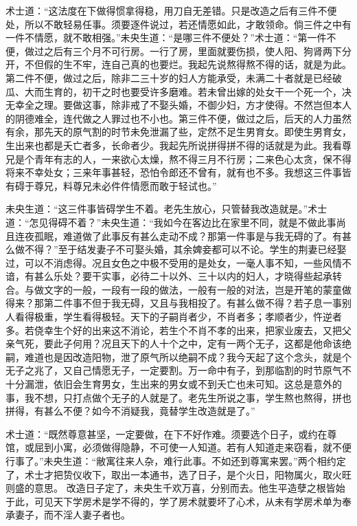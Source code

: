 \documentclass[a4paper,12pt,UTF8,twoside]{ctexbook}
\begin{document}
术士道：“这法度在下做得惯拿得稳，用刀自无差错。只是改造之后有三件不便处，所以不敢轻易任事。须要逐件说过，若还情愿如此，才敢领命。倘三件之中有一件不情愿，就不敢相强。”未央生道：“是哪三件不便处？”术士道：“第一件不便，做过之后有三个月不可行房。一行了房，里面就要伤损，使人阳、狗肾两下分开，不但假的生不牢，连自己真的也要烂。我起先说熬得熬不得的话，就是为此。第二件不便，做过之后，除非二三十岁的妇人方能承受，未满二十者就是已经破瓜、大而生育的，初干之时也要受许多磨难。若未曾出嫁的处女干一个死一个，决无幸全之理。要做这事，除非戒了不娶头婚，不御少妇，方才使得。不然岂但本人的阴德难全，连代做之人罪过也不小也。第三件不便，做过之后，后天的人力虽然有余，那先天的原气割的时节未免泄漏了些，定然不足生男育女。即使生男育女，生出来也都是夭亡者多，长命者少。我起先所说拼得拼不得的话就是为此。我看尊兄是个青年有志的人，一来欲心太燥，熬不得三月不行房；二来色心太贪，保不得将来不幸处女；三来年事甚轻，恐怕令郎还不曾有，就有也不多。我想这三件事皆有碍于尊兄，料尊兄未必件件情愿而敢于轻试也。”

未央生道：“这三件事皆碍学生不着。老先生放心，只管替我改造就是。”术士道：“怎见得碍不着？”未央生道：“我如今在客边比在家里不同，就是不做此事尚且连夜孤眠，难道做了此事反有甚么走动不成？那第一件事是与我无碍的了。有甚么做不得？”至于结发妻子不可娶头婚，其余婢妾都可以不论。学生的荆妻已经娶过，可以不消虑得。况且女色之中极不受用的是处女，一毫人事不知，一些风情不谙，有甚么乐处？要干实事，必待二十以外、三十以内的妇人，才晓得些起承转合。与做文字的一般，一段有一段的做法，一般有一般的对法，岂是开笔的蒙童做得来？那第二件事不但于我无碍，又且与我相投了。有甚么做不得？若子息一事别人看得极重，学生看得极轻。天下的子嗣肖者少，不肖者多；孝顺者少，忤逆者多。若侥幸生个好的出来这不消论，若生个不肖不孝的出来，把家业废去，又把父亲气死，要此子何用？况且天下的人十个之中，定有一两个无子，这都是他命该绝嗣，难道也是因改造阳物，泄了原气所以绝嗣不成？我今天起了这个念头，就是个无子之兆了，又自己情愿无子，一定要割。万一命中有子，到那临割的时节原气不十分漏泄，依旧会生育男女，生出来的男女或不到夭亡也未可知。这总是意外的事，我不想，只打点做个无子的人就是了。老先生所说之事，学生熬也熬得，拼也拼得，有甚么不便？如今不消疑我，竟替学生改造就是了。”

术士道：“既然尊意甚坚，一定要做，在下不好作难。须要选个日子，或约在尊馆，或屈到小寓，必须做得隐静，不可使一人知道。若有人知道走来窃看，就不便行事了。”未央生道：“敝寓往来人杂，难行此事。不如还到尊寓来罢。”两个相约定了，术士才把贽仪收下，取出一本通书，选了日子，是个火日，阳物属火，取火旺则盛的意思。 改造日子定了，未央生千欢万喜，分别而去。他生平造孽之根皆始于此，可见天下学房术是学不得的，学了房术就要坏了心术，从未有学房术单为奉承妻子，而不淫人妻子者也。
\end{document}
